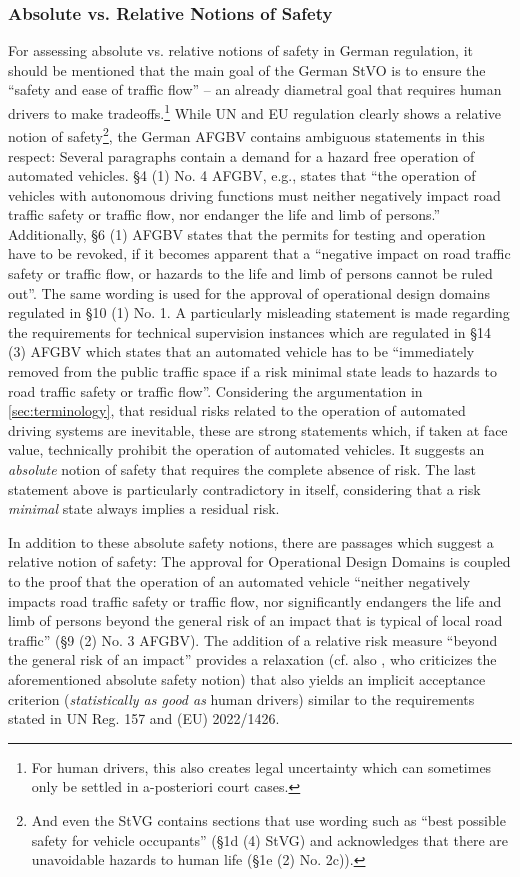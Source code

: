\subsubsection{Absolute vs. Relative Notions of Safety}
For assessing absolute vs. relative notions of safety in German regulation, it should be mentioned that the main goal of the German StVO is to ensure the ``safety and ease of traffic flow'' -- an already diametral goal that requires human drivers to make tradeoffs.\footnote{For human drivers, this also creates legal uncertainty which can sometimes only be settled in a-posteriori court cases.}
While UN and EU regulation clearly shows a relative notion of safety\footnote{And even the StVG contains sections that use wording such as ``best possible safety for vehicle occupants'' (§1d (4) StVG) and acknowledges that there are unavoidable hazards to human life (§1e (2) No. 2c)).}, the German AFGBV contains ambiguous statements in this respect:
Several paragraphs contain a demand for a hazard free operation of automated vehicles.
§4 (1) No. 4 AFGBV, e.g., states that ``the operation of vehicles with autonomous driving functions must neither negatively impact road traffic safety or traffic flow, nor endanger the life and limb of persons.''
Additionally, §6 (1) AFGBV states that the permits for testing and operation have to be revoked, if it becomes apparent that a ``negative impact on road traffic safety or traffic flow, or hazards to the life and limb of persons cannot be ruled out''.
The same wording is used for the approval of operational design domains regulated in §10 (1) No. 1.
A particularly misleading statement is made regarding the requirements for technical supervision instances which are regulated in §14 (3) AFGBV which states that an automated vehicle has to be  ``immediately removed from the public traffic space if a risk minimal state leads to hazards to road traffic safety or traffic flow''.
Considering the argumentation in \cref{sec:terminology}, that residual risks related to the operation of automated driving systems are inevitable, these are strong statements which, if taken at face value, technically prohibit the operation of automated vehicles.
It suggests an \emph{absolute} notion of safety that requires the complete absence of risk.  
The last statement above is particularly contradictory in itself, considering that a risk \emph{minimal} state always implies a residual risk.

In addition to these absolute safety notions, there are passages which suggest a relative notion of safety:
The approval for Operational Design Domains is coupled to the proof that the operation of an automated vehicle ``neither negatively impacts road traffic safety or traffic flow, nor significantly endangers the life and limb of persons beyond the general risk of an impact that is typical of local road traffic'' (§9 (2) No. 3 AFGBV).
The addition of a relative risk measure ``beyond the general risk of an impact'' provides a relaxation (cf. also \cite{steininger2022}, who criticizes the aforementioned absolute safety notion) that also yields an implicit acceptance criterion (\emph{statistically as good as} human drivers) similar to the requirements stated in UN Reg. 157 and (EU) 2022/1426.

